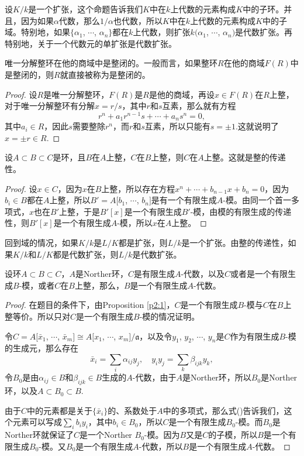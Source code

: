 设$K/k$是一个扩张，这个命题告诉我们$K$中在$k$上代数的元素构成$K$中的子环。并且，因为如果$\alpha$代数，那么$1/\alpha$也代数，所以$K$中在$k$上代数的元素构成$K$中的子域。特别地，如果$\{\alpha_1$, $\cdots$, $\alpha_n\}$都在$k$上代数，则扩张$k(\alpha_1$, $\cdots$, $\alpha_n)$是代数扩张。再特别地，关于一个代数元的单扩张是代数扩张。

\para 唯一分解整环在他的商域中是整闭的。一般而言，如果整环$R$在他的商域$F(R)$中是整闭的，则$R$就直接被称为是整闭的。

\begin{proof} 
	设$R$是唯一分解整环，$F(R)$是$R$是他的商域，再设$x\in F(R)$在$R$上整，对于唯一分解整环有分解$x=r/s$，其中$r$和$s$互素，那么就有方程
	\[
		r^n+a_1r^{n-1}s+\cdots+a_n s^n=0,
	\]
	其中$a_i\in R$，因此$s$需要整除$r^n$，而$r$和$s$互素，所以只能有$s=\pm 1$.这就说明了$x=\pm r\in R$.
\end{proof}

\begin{pro}
设$A\subset B\subset C$是环，且$B$在$A$上整，$C$在$B$上整，则$C$在$A$上整。这就是整的传递性。
\end{pro}

\begin{proof} 
	设$x\in C$，因为$x$在$B$上整，所以存在方程$x^n+\cdots+b_{n-1}x+b_n=0$，因为$b_i\in B$都在$A$上整，所以$B'=A[b_1$, $\cdots$, $b_n]$是有一个有限生成$A$-模。由同一个首一多项式，$x$也在$B'$上整，于是$B'[x]$是一个有限生成$B'$-模，由模的有限生成的传递性，则$B'[x]$是一个有限生成$A$-模，所以$x$在$A$上整。
\end{proof}

回到域的情况，如果$K/k$是$L/K$都是扩张，则$L/k$是一个扩张。由整的传递性，如果$K/k$和$L/K$都是代数扩张，则$L/k$是代数扩张。

\begin{pro}\label{p:2.4}
设环$A\subset B\subset C$，$A$是Norther环，$C$是有限生成$A$-代数，以及$C$或者是一个有限生成$B$-模，或者$C$在$B$上整，那么，$B$是一个有限生成$A$-代数。
\end{pro}

\begin{proof} 
	在题目的条件下，由Proposition \ref{p2:1}，$C$是一个有限生成$B$-模与$C$在$B$上整等价。所以只对$C$是一个有限生成$B$-模的情况证明。

	令$C=A[\bar{x}_1$, $\cdots$, $\bar{x}_m]\cong A[x_1$, $\cdots$, $x_m]/\mathfrak{a}$，以及令$y_1$, $y_2$, $\cdots$, $y_n$是$C$作为有限生成$B$-模的生成元，那么存在
	\begin{equation}
		\bar{x}_i=\sum_i\alpha_{ij}y_j,\quad y_iy_j=\sum_{k}\beta_{ijk}y_k,
	\end{equation}
	令$B_0$是由$\alpha_{ij}\in B$和$\beta_{ijk}\in B$生成的$A$-代数，由于$A$是Norther环，所以$B_0$是Norther环，以及$A\subset B_0 \subset B$.

	由于$C$中的元素都是关于$\{\bar{x}_i\}$的、系数处于$A$中的多项式，那么式(\theequation)告诉我们，这个元素可以写成$\sum_i b_i y_i$，其中$b_i\in B_0$，所以$C$是一个有限生成$B_0$-模。而$B_0$是Norther环就保证了$C$是一个Norther $B_0$-模。因为$B$又是$C$的子模，所以$B$是一个有限生成$B_0$-模。又$B_0$是一个有限生成$A$-代数，所以$B$是一个有限生成$A$-代数。
\end{proof}


